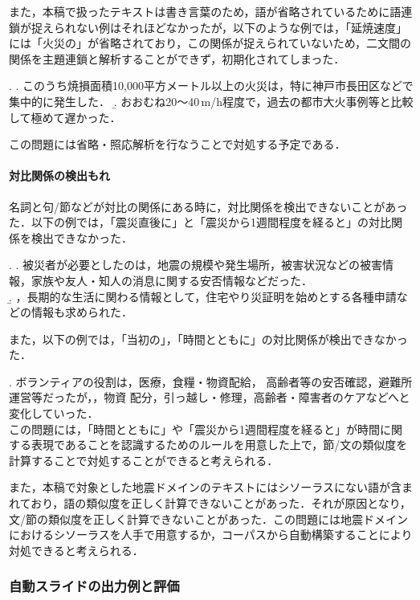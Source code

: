 また，本稿で扱ったテキストは書き言葉のため，語が省略されているために語連
鎖が捉えられない例はそれほどなかったが，以下のような例では，「延焼速度」
には「火災の」が省略されており，この関係が捉えられていないため，二文間の
関係を主題連鎖と解析することができず，初期化されてしまった．

\ex. \a. このうち焼損面積10,000平方メートル以上の火災は，特に神戸市長田区などで集中的に発生した．
\b. おおむね20〜40\,m/h程度で，過去の都市大火事例等と比較して極めて遅かった．

この問題には省略・照応解析を行なうことで対処する予定である．

\paragraph{対比関係の検出もれ}

名詞と句/節などが対比の関係にある時に，対比関係を検出できないことがあっ
た．以下の例では，「震災直後に」と「震災から1週間程度を経ると」の対比関
係を検出できなかった．

\ex. \a. 被災者が必要としたのは，地震の規模や発生場所，被害状況などの被害情報，家族や友人・知人の消息に関する安否情報などだった．\\
 \b. ，長期的な生活に関わる情報として，住宅やり災証明を始めとする各種申請などの情報も求められた．

また，以下の例では，「当初の」，「時間とともに」の対比関係が検出できなかっ
た．

\ex. ボランティアの役割は，医療，食糧・物資配給，
高齢者等の安否確認，避難所運営等だったが，，物資
配分，引っ越し・修理，高齢者・障害者のケアなどへと変化していった．\\

この問題には，「時間とともに」や「震災から1週間程度を経ると」が時間に関
する表現であることを認識するためのルールを用意した上で，節/文の類似度を
計算することで対処することができると考えられる．

また，本稿で対象とした地震ドメインのテキストにはシソーラスにない語が含ま
れており，語の類似度を正しく計算できないことがあった．それが原因となり，
文/節の類似度を正しく計算できないことがあった．この問題には地震ドメイン
におけるシソーラスを人手で用意するか，コーパスから自動構築することにより
対処できると考えられる．


\subsubsection{自動スライドの出力例と評価}

